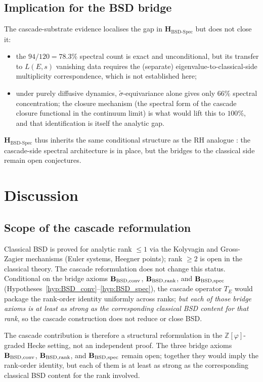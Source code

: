 \documentclass[11pt, a4paper]{amsart}
\theoremstyle{definition}
\newcommand{\Z}{\mathbb{Z}}
\begin{document}
\subsection{Implication for the BSD bridge}

The cascade-substrate evidence localises the gap in
$\mathbf{H_{\mathrm{BSD\text{-}Spec}}}$ but does not close it:
\begin{itemize}
\item the $94/120 = 78.3\%$ spectral count is exact and
unconditional, but its transfer to $L(E,s)$ vanishing data
requires the (separate) eigenvalue-to-classical-side multiplicity
correspondence, which is not established here;
\item under purely diffusive dynamics, $\widetilde\sigma$-equivariance
alone gives only $66\%$ spectral concentration; the closure
mechanism (the spectral form of the cascade closure functional in
the continuum limit) is what would lift this to $100\%$, and that
identification is itself the analytic gap.
\end{itemize}
$\mathbf{H_{\mathrm{BSD\text{-}Spec}}}$ thus inherits the same
conditional structure as the RH analogue
\cite[Remark rmk:strengthened]{CascadeRHformal}: the cascade-side
spectral architecture is in place, but the bridges to the classical
side remain open conjectures.

\section{Discussion}

\subsection{Scope of the cascade reformulation}

Classical BSD is proved for analytic rank $\leq 1$ via the
Kolyvagin and Gross-Zagier mechanisms (Euler systems, Heegner
points); rank $\geq 2$ is open in the classical theory. The
cascade reformulation does not change this status. Conditional on
the bridge axioms $\mathbf{B_{\rm BSD,conv}}$,
$\mathbf{B_{\rm BSD,rank}}$, and $\mathbf{B_{\rm BSD,spec}}$
(Hypotheses~\ref{hyp:BSD_conv}--\ref{hyp:BSD_spec}), the cascade
operator $T_E$ would package the rank-order identity uniformly
across ranks; \emph{but each of those bridge axioms is at least as
strong as the corresponding classical BSD content for that rank},
so the cascade construction does not reduce or close BSD.

The cascade contribution is therefore a structural reformulation
in the $\Z[\varphi]$-graded Hecke setting, not an independent
proof. The three bridge axioms $\mathbf{B_{\rm BSD,conv}}$,
$\mathbf{B_{\rm BSD,rank}}$, and $\mathbf{B_{\rm BSD,spec}}$
remain open; together they would imply the rank-order identity,
but each of them is at least as strong as the corresponding
classical BSD content for the rank involved.
\end{document}
